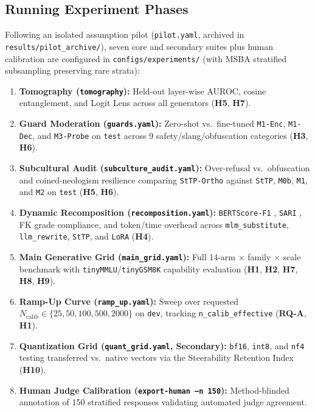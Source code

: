 \documentclass[11pt,letterpaper]{article}
\begin{document}
\subsection{Running Experiment Phases}
Following an isolated assumption pilot (\texttt{pilot.yaml}, archived in \texttt{results/pilot\_archive/}), seven core and secondary suites plus human calibration are configured in \texttt{configs/experiments/} (with MSBA stratified subsampling preserving rare strata):
\begin{enumerate}[leftmargin=1.5em]
    \item \textbf{Tomography (\texttt{tomography}):} Held-out layer-wise AUROC, cosine entanglement, and Logit Lens across all generators (\textbf{H5}, \textbf{H7}).
    \item \textbf{Guard Moderation (\texttt{guards.yaml}):} Zero-shot vs.\ fine-tuned \texttt{M1-Enc}, \texttt{M1-Dec}, and \texttt{M3-Probe} on \texttt{test} across 9 safety/slang/obfuscation categories (\textbf{H3}, \textbf{H6}).
    \item \textbf{Subcultural Audit (\texttt{subculture\_audit.yaml}):} Over-refusal vs.\ obfuscation and coined-neologism resilience comparing \texttt{StTP-Ortho} against \texttt{StTP}, \texttt{M0b}, \texttt{M1}, and \texttt{M2} on \texttt{test} (\textbf{H5}, \textbf{H6}).
    \item \textbf{Dynamic Recomposition (\texttt{recomposition.yaml}):} \texttt{BERTScore-F1} \citep{zhang2020bertscore}, \texttt{SARI} \citep{xu2016sari}, FK grade compliance, and token/time overhead across \texttt{mlm\_substitute}, \texttt{llm\_rewrite}, \texttt{StTP}, and \texttt{LoRA} (\textbf{H4}).
    \item \textbf{Main Generative Grid (\texttt{main\_grid.yaml}):} Full 14-arm $\times$ family $\times$ scale benchmark with \texttt{tinyMMLU}/\texttt{tinyGSM8K} capability evaluation (\textbf{H1}, \textbf{H2}, \textbf{H7}, \textbf{H8}, \textbf{H9}).
    \item \textbf{Ramp-Up Curve (\texttt{ramp\_up.yaml}):} Sweep over requested $N_{\text{calib}} \in \{25, 50, 100, 500, 2000\}$ on \texttt{dev}, tracking \texttt{n\_calib\_effective} (\textbf{RQ-A}, \textbf{H1}).
    \item \textbf{Quantization Grid (\texttt{quant\_grid.yaml}, Secondary):} \texttt{bf16}, \texttt{int8}, and \texttt{nf4} testing transferred vs.\ native vectors via the Steerability Retention Index (\textbf{H10}).
    \item \textbf{Human Judge Calibration (\texttt{export-human --n 150}):} Method-blinded annotation of 150 stratified responses validating automated judge agreement.
\end{enumerate}
\end{document}
